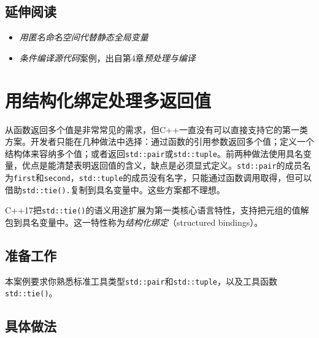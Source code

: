
\subsection{延伸阅读}



\begin{itemize}
\item \textit{用匿名命名空间代替静态全局变量}



\item \textit{条件编译源代码}案例，出自第4章\textit{预处理与编译}

\end{itemize}



\section{用结构化绑定处理多返回值}



从函数返回多个值是非常常见的需求，但C++一直没有可以直接支持它的第一类方案。开发者只能在几种做法中选择：通过函数的引用参数返回多个值；定义一个结构体来容纳多个值；或者返回\texttt{std::\allowbreak{}pair}或\texttt{std::\allowbreak{}tuple}。前两种做法使用具名变量，优点是能清楚表明返回值的含义，缺点是必须显式定义。\texttt{std::\allowbreak{}pair}的成员名为\texttt{first}和\texttt{second}，\texttt{std::\allowbreak{}tuple}的成员没有名字，只能通过函数调用取得，但可以借助\texttt{std::\allowbreak{}tie().}复制到具名变量中。这些方案都不理想。



C++17把\texttt{std::\allowbreak{}tie()}的语义用途扩展为第一类核心语言特性，支持把元组的值解包到具名变量中。这一特性称为\textit{结构化绑定}（structured bindings）。



\subsection{准备工作}



本案例要求你熟悉标准工具类型\texttt{std::\allowbreak{}pair}和\texttt{std::\allowbreak{}tuple}，以及工具函数\texttt{std::\allowbreak{}tie()}。



\subsection{具体做法}


